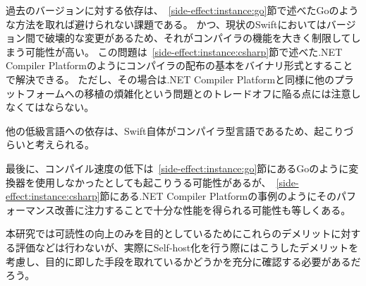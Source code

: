 過去のバージョンに対する依存は、~\ref{side-effect:instance:go}節で述べたGoのような方法を取れば避けられない課題である。
かつ、現状のSwiftにおいてはバージョン間で破壊的な変更があるため、それがコンパイラの機能を大きく制限してしまう可能性が高い。
この問題は~\ref{side-effect:instance:csharp}節で述べた.NET Compiler Platformのようにコンパイラの配布の基本をバイナリ形式とすることで解決できる。
ただし、その場合は.NET Compiler Platformと同様に他のプラットフォームへの移植の煩雑化という問題とのトレードオフに陥る点には注意しなくてはならない。

他の低級言語への依存は、Swift自体がコンパイラ型言語であるため、起こりづらいと考えられる。

最後に、コンパイル速度の低下は~\ref{side-effect:instance:go}節にあるGoのように変換器を使用しなかったとしても起こりうる可能性があるが、~\ref{side-effect:instance:csharp}節にある.NET Compiler Platformの事例のようにそのパフォーマンス改善に注力することで十分な性能を得られる可能性も等しくある。

本研究では可読性の向上のみを目的としているためにこれらのデメリットに対する評価などは行わないが、実際にSelf-host化を行う際にはこうしたデメリットを考慮し、目的に即した手段を取れているかどうかを充分に確認する必要があるだろう。

